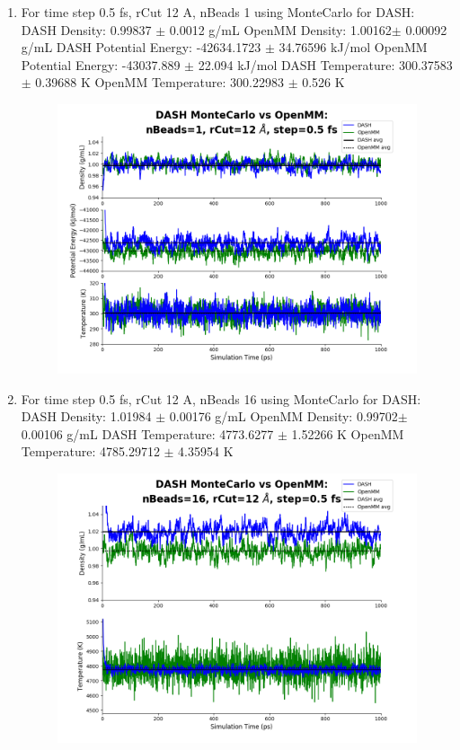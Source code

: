 \documentclass[12pt,reqno]{amsart}
\numberwithin{equation}{section}
\begin{document}
\begin{enumerate}
\item For time step 0.5 fs, rCut 12 A, nBeads 1 using MonteCarlo for DASH:
\subitem DASH Density: 0.99837 $\pm$ 0.0012 g/mL
\subitem OpenMM Density: 1.00162$\pm$ 0.00092 g/mL
\subitem DASH Potential Energy: -42634.1723 $\pm$ 34.76596 kJ/mol
\subitem OpenMM Potential Energy: -43037.889 $\pm$ 22.094 kJ/mol
\subitem DASH Temperature: 300.37583 $\pm$ 0.39688  K
\subitem OpenMM Temperature:  300.22983 $\pm$ 0.526 K
\begin{figure}[H]
\centering
\includegraphics[scale=0.7]{MC-MM-nBead1-rCut12-ts05}
\end{figure}

\item For time step 0.5 fs, rCut 12 A, nBeads 16 using MonteCarlo for DASH:
\subitem DASH Density: 1.01984 $\pm$ 0.00176 g/mL
\subitem OpenMM Density: 0.99702$\pm$ 0.00106 g/mL
\subitem DASH Temperature: 4773.6277 $\pm$ 1.52266  K
\subitem OpenMM Temperature:  4785.29712 $\pm$ 4.35954 K
\begin{figure}[H]
\centering
\includegraphics[scale=0.7]{MC-MM-nBead16-rCut12-ts05}
\end{figure}


\end{enumerate}
\end{document}
